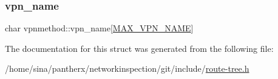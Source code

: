 \subsubsection{\texorpdfstring{vpn\+\_\+name}{vpn\_name}}
{\footnotesize\ttfamily char vpnmethod\+::vpn\+\_\+name\mbox{[}\hyperlink{route-tree_8h_a77ed9a5f9670b7a2d69c376d1199eddf}{M\+A\+X\+\_\+\+V\+P\+N\+\_\+\+N\+A\+ME}\mbox{]}}



The documentation for this struct was generated from the following file\+:\begin{DoxyCompactItemize}
\item 
/home/sina/pantherx/networkinspection/git/include/\hyperlink{route-tree_8h}{route-\/tree.\+h}\end{DoxyCompactItemize}
